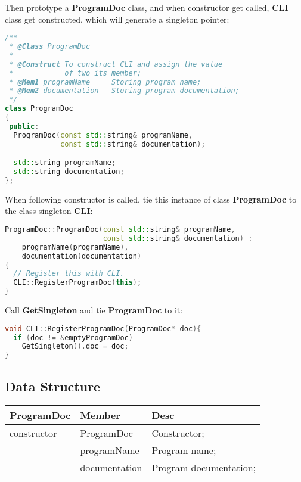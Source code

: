 \documentclass[11pt]{article}
\begin{document}
Then prototype a \textbf{ProgramDoc} class, and when constructor get called, \textbf{CLI} class get constructed, which will generate a singleton pointer:

\begin{lstlisting}[language=c++,label=lst:1lst,caption=ProgramDoc(\textbf{option.hpp})]
/**
 * @Class ProgramDoc
 * 
 * @Construct To construct CLI and assign the value 
 *            of two its member;
 * @Mem1 programName     Storing program name;
 * @Mem2 documentation   Storing program documentation;
 */
class ProgramDoc
{
 public:
  ProgramDoc(const std::string& programName,
             const std::string& documentation);

  std::string programName;
  std::string documentation;
};
\end{lstlisting}

When following constructor is called, tie this instance of class \textbf{ProgramDoc} to the class singleton \textbf{CLI}:

\begin{lstlisting}[language=c++,label=lst:2lst,caption=ProgramDoc Constructor(\textbf{option.cpp})]
ProgramDoc::ProgramDoc(const std::string& programName,
                       const std::string& documentation) :
    programName(programName),
    documentation(documentation)
{
  // Register this with CLI.
  CLI::RegisterProgramDoc(this);
}
\end{lstlisting}
Call \textbf{GetSingleton} and tie \textbf{ProgramDoc} to it:
\begin{lstlisting}[language=c++,label=lst:3lst,caption=ProgramDoc Constructor 2(\textbf{option.cpp})]
void CLI::RegisterProgramDoc(ProgramDoc* doc){
  if (doc != &emptyProgramDoc)
    GetSingleton().doc = doc;
}
\end{lstlisting}


\subsection{Data Structure}%
\label{sub:data_structure}

\begin{center}
  \begin{tabular}{|p{3cm}|p{6cm}|p{6cm}|}
    \hline
     \textbf{ProgramDoc} & \textbf{Member}& \textbf{Desc} \\
    \hline
      constructor& ProgramDoc & Constructor; \\
    \hline
      & programName & Program name; \\
    \hline
      & documentation & Program documentation;\\
    \hline
  \end{tabular}
\end{center}
\end{document}

